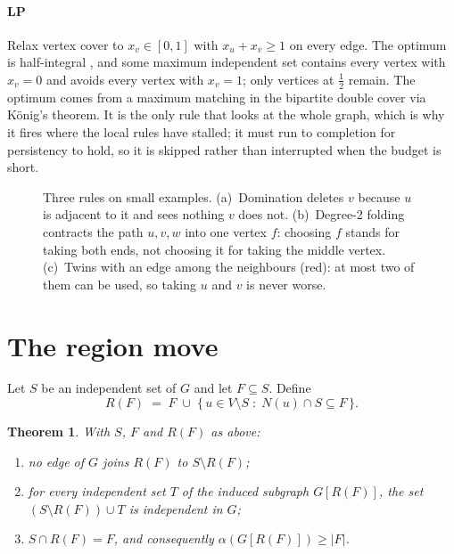 \documentclass[review,authoryear,11pt]{elsarticle}
\newtheorem{theorem}{Theorem}
\theoremstyle{definition}
\begin{document}
\paragraph{LP} Relax vertex cover to $x_v\in[0,1]$ with $x_u+x_v\ge 1$ on every
edge. The optimum is half-integral \citep{nemhauser1975}, and some maximum
independent set contains every vertex with $x_v=0$ and avoids every vertex with
$x_v=1$; only vertices at $\tfrac12$ remain. The optimum comes from a maximum
matching in the bipartite double cover via K\"onig's theorem. It is the only rule
that looks at the whole graph, which is why it fires where the local rules have
stalled; it must run to completion for persistency to hold, so it is skipped
rather than interrupted when the budget is short.

\begin{figure}[htbp]
\centering
\resizebox{0.8\textwidth}{!}{}
\caption{Three rules on small examples. (a)~Domination deletes $v$ because $u$ is
adjacent to it and sees nothing $v$ does not. (b)~Degree-2 folding contracts the
path $u,v,w$ into one vertex $f$: choosing $f$ stands for taking both ends, not
choosing it for taking the middle vertex. (c)~Twins with an edge among the
neighbours (red): at most two of them can be used, so taking $u$ and $v$ is never
worse.}
\label{fig:rules}
\end{figure}

\section{The region move}
\label{sec:move}

Let $S$ be an independent set of $G$ and let $F \subseteq S$. Define
\begin{equation}
R(F) \;=\; F \;\cup\; \{\, u \in V \setminus S \;:\; N(u) \cap S \subseteq F \,\}.
\label{eq:region}
\end{equation}

\begin{theorem}
\label{thm:region}
With $S$, $F$ and $R(F)$ as above:
\begin{enumerate}
\item[(a)] no edge of $G$ joins $R(F)$ to $S \setminus R(F)$;
\item[(b)] for every independent set $T$ of the induced subgraph $G[R(F)]$, the
      set $(S \setminus R(F)) \cup T$ is independent in $G$;
\item[(c)] $S \cap R(F) = F$, and consequently $\alpha(G[R(F)]) \ge |F|$.
\end{enumerate}
\end{theorem}
\end{document}
